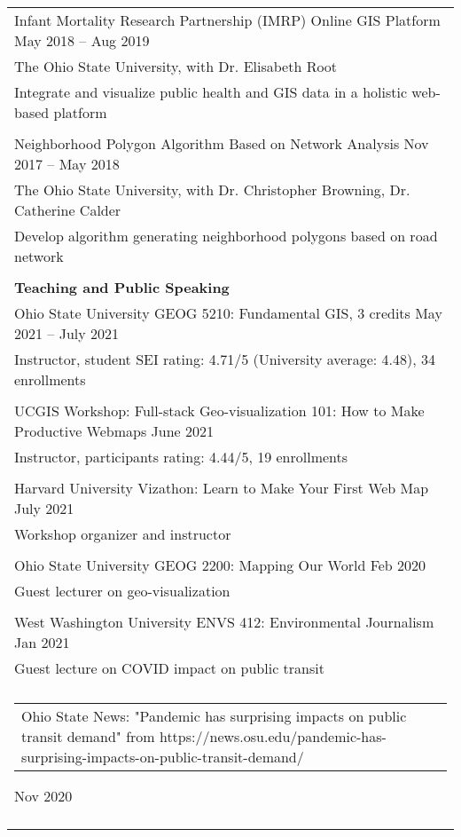 \documentclass[letterpaper, 11pt]{article}
\begin{document}
\begin{longtable}{p{6.5in}}
Infant Mortality Research Partnership (IMRP) Online GIS Platform \hfill May 2018 -- Aug 2019 \\
The Ohio State University, with Dr. Elisabeth Root \\
Integrate and visualize public health and GIS data in a holistic web-based platform \\\\

Neighborhood Polygon Algorithm Based on Network Analysis \hfill Nov 2017 -- May 2018 \\
The Ohio State University, with Dr. Christopher Browning, Dr. Catherine Calder \\
Develop algorithm generating neighborhood polygons based on road network \\\\


\textbf{Teaching and Public Speaking} \\
Ohio State University GEOG 5210: Fundamental GIS, 3 credits \hfill May 2021 -- July 2021 \\
Instructor, student SEI rating: 4.71/5 (University average: 4.48), 34 enrollments \\\\

UCGIS Workshop: Full-stack Geo-visualization 101: How to Make Productive Webmaps \hfill June 2021 \\
Instructor, participants rating: 4.44/5, 19 enrollments \\\\

Harvard University Vizathon: Learn to Make Your First Web Map \hfill July 2021\\
Workshop organizer and instructor \\\\

Ohio State University GEOG 2200: Mapping Our World \hfill Feb 2020\\
Guest lecturer on geo-visualization \\\\

West Washington University ENVS 412: Environmental Journalism \hfill Jan 2021\\
Guest lecture on COVID impact on public transit \\\\

\begin{tabular}{p{5in}}
Ohio State News: "Pandemic has surprising impacts on public transit demand" from https://news.osu.edu/pandemic-has-surprising-impacts-on-public-transit-demand/
\end{tabular} \hfill Nov 2020 \\\\


\end{longtable}
\end{document}
